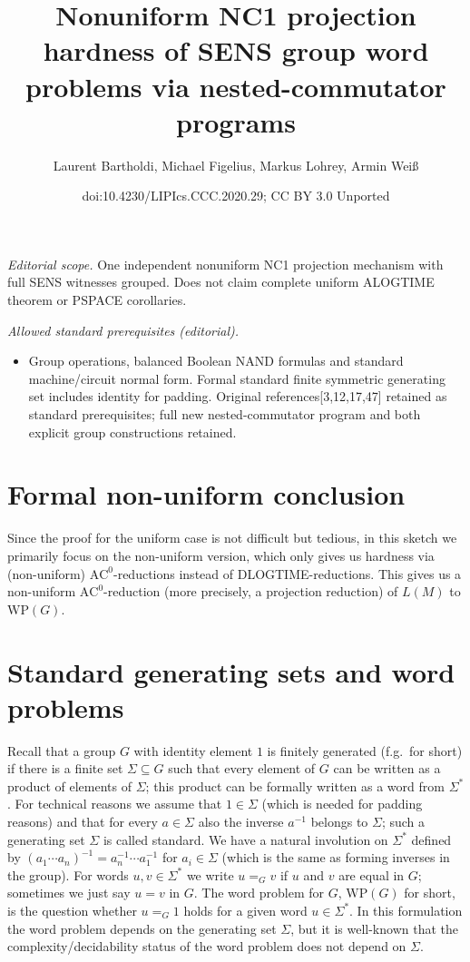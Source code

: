 \documentclass[10pt,a4paper]{article}
\title{Nonuniform NC1 projection hardness of SENS group word problems via nested-commutator programs}
\author{Laurent Bartholdi, Michael Figelius, Markus Lohrey, Armin Weiß}
\date{doi:10.4230/LIPIcs.CCC.2020.29; CC BY 3.0 Unported}
\begin{document}
\maketitle
\noindent\textit{Editorial scope.} One independent nonuniform NC1 projection mechanism with full SENS witnesses grouped. Does not claim complete uniform ALOGTIME theorem or PSPACE corollaries.\par\medskip
\noindent\textit{Allowed standard prerequisites (editorial).}\begin{itemize}
\item Group operations, balanced Boolean NAND formulas and standard machine/circuit normal form. Formal standard finite symmetric generating set includes identity for padding. Original references[3,12,17,47] retained as standard prerequisites; full new nested-commutator program and both explicit group constructions retained.
\end{itemize}\medskip
\section*{Formal non-uniform conclusion}
Since the proof for the uniform case is not difficult but tedious, in this sketch we primarily focus on the non-uniform version, which only gives us hardness via (non-uniform) $\mathrm{AC}^0$-reductions instead of DLOGTIME-reductions.
This gives us a non-uniform $\mathrm{AC}^0$-reduction (more precisely, a projection reduction) of $L(M)$ to $\mathrm{WP}(G)$.

\section*{Standard generating sets and word problems}
Recall that a group $G$ with identity element $1$ is finitely generated (f.g.\ for short) if there is a finite set $\Sigma\subseteq G$ such that every element of $G$ can be written as a product of elements of $\Sigma$; this product can be formally written as a word from $\Sigma^*$. For technical reasons we assume that $1\in\Sigma$ (which is needed for padding reasons) and that for every $a\in\Sigma$ also the inverse $a^{-1}$ belongs to $\Sigma$; such a generating set $\Sigma$ is called standard. We have a natural involution on $\Sigma^*$ defined by $(a_1\cdots a_n)^{-1}=a_n^{-1}\cdots a_1^{-1}$ for $a_i\in\Sigma$ (which is the same as forming inverses in the group). For words $u,v\in\Sigma^*$ we write $u=_Gv$ if $u$ and $v$ are equal in $G$; sometimes we just say $u=v$ in $G$. The word problem for $G$, $\mathrm{WP}(G)$ for short, is the question whether $u=_G1$ holds for a given word $u\in\Sigma^*$. In this formulation the word problem depends on the generating set $\Sigma$, but it is well-known that the complexity/decidability status of the word problem does not depend on $\Sigma$.
\end{document}
